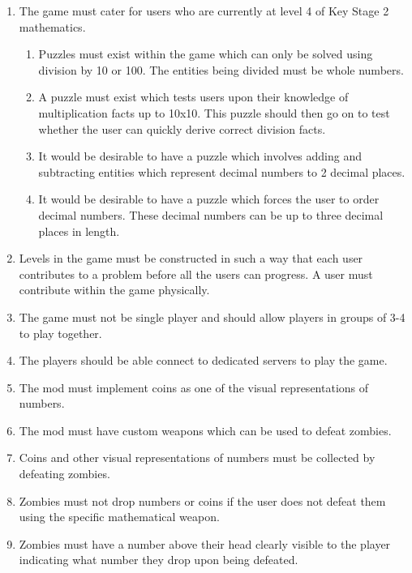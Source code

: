 \begin{enumerate}
		\item The game must cater for users who are currently at level 4 of Key Stage 2 mathematics.
		\begin{enumerate}[label={3.\arabic*},nolistsep,leftmargin=*]
			\item Puzzles must exist within the game which can only be solved using division by 10 or 100. The entities being divided must be whole numbers.
			\item A puzzle must exist which tests users upon their knowledge of multiplication facts up to 10x10. This puzzle should then go on to test whether the user can quickly derive correct division facts.
			\item It would be desirable to have a puzzle which involves adding and subtracting entities which represent decimal numbers to 2 decimal places.
			\item It would be desirable to have a puzzle which forces the user to order decimal numbers. These decimal numbers can be up to three decimal places in length.
		\end{enumerate}
		
	\item Levels in the game must be constructed in such a way that each user contributes to a problem before all the users can progress. A user must contribute within the game physically.
	\item The game must not be single player and should allow players in groups of 3-4 to play together.
	\item The players should be able connect to dedicated servers to play the game.
	
	\item The mod must implement coins as one of the visual representations of numbers.
	
	\item The mod must have custom weapons which can be used to defeat zombies.
	
	\item Coins and other visual representations of numbers must be collected by defeating zombies.
	
	\item Zombies must not drop numbers or coins if the user does not defeat them using the specific mathematical weapon.
	
	\item Zombies must have a number above their head clearly visible to the player indicating what number they drop upon being defeated.
	

\end{enumerate}
